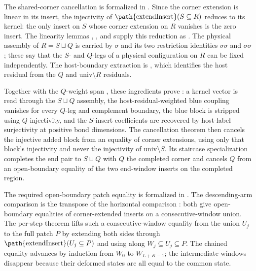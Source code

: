\documentclass{article}
\begin{document}
The shared-corner cancellation is formalized in
. Since the corner extension is linear
in its insert, the injectivity of $\text{\path{extendInsert}}(S\subseteq R)$ reduces
to its kernel: the only insert on $S$ whose corner extension on $R$ vanishes is
the zero insert. The linearity lemmas ,
, and  supply this
reduction as . The physical
assembly of $R=S\sqcup Q$ is carried by $\sigma$ and its two
restriction identities
$\sigma$$\sigma$ and
$\sigma$$\sigma$; these say that the $S$-
and $Q$-legs of a physical configuration on $R$ can be fixed independently.
The host-boundary extraction is
, which
identifies the host residual from the $Q$ and $\mathrm{univ}\setminus R$
residuals.

Together with the $Q$-weight span
, these
ingredients prove : a
kernel vector is read through the $S\sqcup Q$ assembly, the
host-residual-weighted blue coupling vanishes for every $Q$-leg and complement
boundary, the blue block is stripped using $Q$ injectivity, and the
$S$-insert coefficients are recovered by host-label surjectivity at positive
bond dimensions. The cancellation theorem
 then cancels the injective added
block from an equality of corner extensions, using only that block's
injectivity and never the injectivity of $\mathrm{univ}\setminus S$. Its
staircase specialization  completes the end pair to
$S\sqcup Q$ with $Q$ the completed corner and cancels $Q$ from an
open-boundary equality of the two end-window inserts on the completed region.

The required open-boundary patch equality is formalized in
. The descending-arm comparison
 is the transpose of the horizontal
comparison : both give
open-boundary equalities of corner-extended inserts on a consecutive-window
union. The per-step theorem  lifts such a
consecutive-window equality from the union $U_j$ to the full patch $P$ by
extending both sides through $\text{\path{extendInsert}}(U_j\subseteq P)$ and using
 along $W_j\subseteq U_j\subseteq P$. The chained
equality  advances by induction from $W_0$ to
$W_{L+K-1}$; the intermediate windows disappear because their deformed states
are all equal to the common state.
\end{document}
